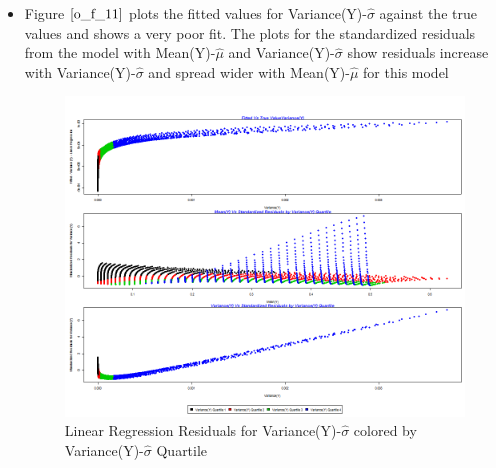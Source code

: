 \documentclass[twoside,12pt]{article}
\begin{document}
\begin{itemize}
\FloatBarrier
\item
Figure $\eqref{o_f_11}$ plots the fitted values for Variance(Y)-$\hat{\sigma}$ against the true values and shows a very poor fit.  The plots for the standardized residuals from the model with Mean(Y)-$\hat{\mu}$ and Variance(Y)-$\hat{\sigma}$ show residuals increase with Variance(Y)-$\hat{\sigma}$ and spread wider with Mean(Y)-$\hat{\mu}$ for this model
\FloatBarrier
\begin{figure}[!htbp]
\centering
\includegraphics[scale=.50]{images/mt_rse_plot_var_v_trg_slg.png} 
\caption{Linear Regression Residuals for Variance(Y)-$\hat{\sigma}$  colored by Variance(Y)-$\hat{\sigma}$  Quartile}
\label{o_f_11}
\end{figure}

\end{itemize}


\FloatBarrier
\end{document}
